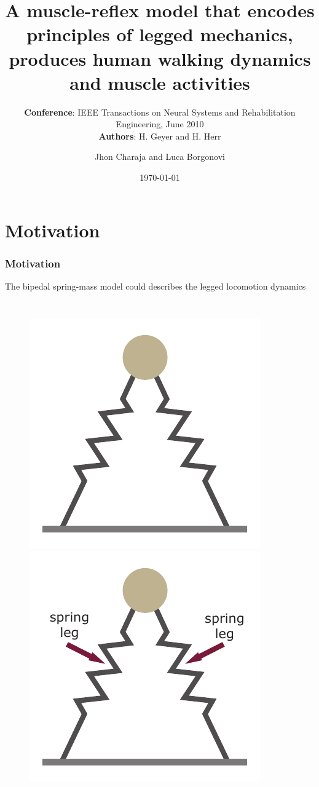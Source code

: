 \documentclass[10pt]{beamer}
\title[Article presentation]{A muscle-reflex model that encodes principles of legged mechanics, produces human walking dynamics and muscle activities}
\subtitle{
	 	\textbf{Conference}: IEEE Transactions on Neural Systems and Rehabilitation Engineering, June 2010
	\\ \textbf{Authors}: H. Geyer and H. Herr}
\author[J. Charaja and L. Borgonovi]{Jhon Charaja\inst{1} and Luca Borgonovi\inst{1}}
\institute[USP]{
	\inst{1} Universidade de São Paulo, Brasil
}
\date{\today}
\begin{document}
\frame{\titlepage}

\section{Motivation}
\begin{frame}
	\frametitle{Motivation}
	The bipedal spring-mass model could describes the legged locomotion dynamics\footnotemark[1]
	\begin{columns}
		\begin{figure}
			\begin{overprint}
				\includegraphics[width=.9\textwidth]{images/slip/double_SLIP.pdf}
				\onslide<2>\includegraphics[width=.9\textwidth]{images/slip/double_SLIP_spring_leg.pdf}

\end{overprint}
\end{figure}
\end{columns}
\end{frame}
\end{document}
